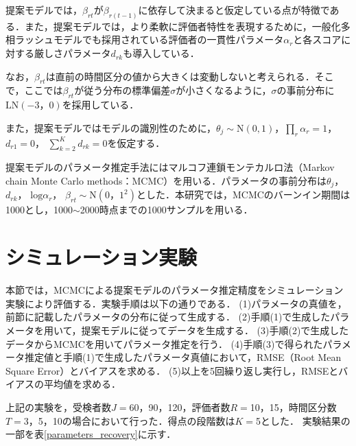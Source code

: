 \documentclass[dvipdfmx, twocolumn, a4paper]{hcresume}
\begin{document}
提案モデルでは，$\beta_{rt}$が$\beta_{r(t-1)}$に依存して決まると仮定している点が特徴である．また，提案モデルでは，より柔軟に評価者特性を表現するために，一般化多相ラッシュモデルでも採用されている評価者の一貫性パラメータ$\alpha_r$と各スコアに対する厳しさパラメータ$d_{rk}$も導入している．

なお，$\beta_{rt}$は直前の時間区分の値から大きくは変動しないと考えられる．そこで，ここでは$\beta_{rt}$が従う分布の標準偏差$\sigma$が小さくなるように，$\sigma$の事前分布に$\mathrm{LN}(−3，0)$を採用している．

また，提案モデルではモデルの識別性のために，$\theta_{j}\sim \mathrm{N}(0,1)$，$\prod_{r}\alpha_r=1$， $d_{r1}=0$， $\sum_{k=2}^{K}d_{rk}=0$を仮定する．

提案モデルのパラメータ推定手法にはマルコフ連鎖モンテカルロ法（Markov chain Monte Carlo methods：MCMC）を用いる．パラメータの事前分布は$\theta_{j}$， $d_{rk}$， $\mathrm{log}\alpha_{r}$， $\beta_{rt}\sim \mathrm{N}(0，1^{2})$とした．本研究では，MCMCのバーンイン期間は1000とし，1000$\sim$2000時点までの1000サンプルを用いる．
\section{シミュレーション実験}

本節では，MCMCによる提案モデルのパラメータ推定精度をシミュレーション実験により評価する．実験手順は以下の通りである．
(1)パラメータの真値を，前節に記載したパラメータの分布に従って生成する．
(2)手順(1)で生成したパラメータを用いて，提案モデルに従ってデータを生成する．
(3)手順(2)で生成したデータからMCMCを用いてパラメータ推定を行う．
(4)手順(3)で得られたパラメータ推定値と手順(1)で生成したパラメータ真値において，RMSE（Root Mean Square Error）とバイアスを求める．
(5)以上を5回繰り返し実行し，RMSEとバイアスの平均値を求める．

上記の実験を，受検者数$J=$60，90，120，評価者数$R=$10，15，時間区分数$T=$3，5，10の場合において行った．得点の段階数は$K=$5とした．
実験結果の一部を表\ref{parameters_recovery}に示す．
\end{document}
